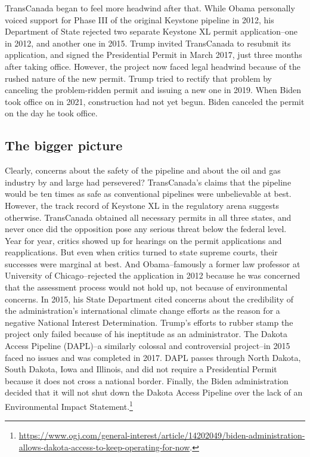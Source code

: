 \documentclass{article}
\begin{document}
	TransCanada began to feel more headwind after that. While Obama personally voiced support for Phase III of the original Keystone pipeline in 2012, his Department of State rejected two separate Keystone XL permit application--one in 2012, and another one in 2015. Trump invited TransCanada to resubmit its application, and signed the Presidential Permit in March 2017, just three months after taking office. However, the project now faced legal headwind because of the rushed nature of the new permit. Trump tried to rectify that problem by canceling the problem-ridden permit and issuing a new one in 2019. When Biden took office on in 2021, construction had not yet begun. Biden canceled the permit on the day he took office.

	\subsection*{The bigger picture}

	Clearly, concerns about the safety of the pipeline and about the oil and gas industry by and large had persevered? TransCanada's claims that the pipeline would be ten times as safe as conventional pipelines were unbelievable at best. However, the track record of Keystone XL in the regulatory arena suggests otherwise. TransCanada obtained all necessary permits in all three states, and never once did the opposition pose any serious threat below the federal level. Year for year, critics showed up for hearings on the permit applications and reapplications. But even when critics turned to state supreme courts, their successes were marginal at best. And Obama--famously a former law professor at University of Chicago--rejected the application in 2012 because he was concerned that the assessment process would not hold up, not because of environmental concerns. In 2015, his State Department cited concerns about the credibility of the administration's international climate change efforts as the reason for a negative National Interest Determination. Trump's efforts to rubber stamp the project only failed because of his ineptitude as an administrator. The Dakota Access Pipeline (DAPL)--a similarly colossal and controversial project--in 2015 faced no issues and was completed in 2017. DAPL passes through North Dakota, South Dakota, Iowa and Illinois, and did not require a Presidential Permit because it does not cross a national border. Finally, the Biden administration decided that it will not shut down the Dakota Access Pipeline over the lack of an Environmental Impact Statement.\footnote{\url{https://www.ogj.com/general-interest/article/14202049/biden-administration-allows-dakota-access-to-keep-operating-for-now}.}
\end{document}
